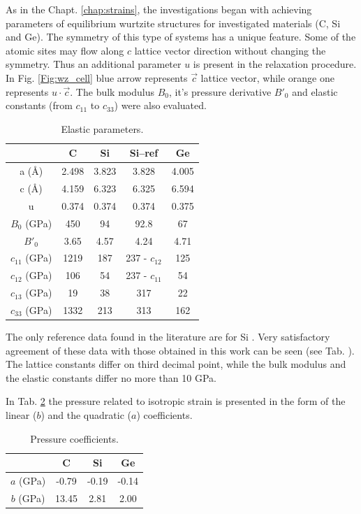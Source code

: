 As in the Chapt. \ref{chap:strains}, the investigations began with achieving parameters of equilibrium wurtzite structures for investigated materials (C, Si and Ge).
The symmetry of this type of systems has a unique feature.
Some of the atomic sites may flow along $c$ lattice vector direction without changing the symmetry.
Thus an additional parameter $u$ is present in the relaxation procedure.
In Fig. \ref{Fig:wz_cell} blue arrow represents $\Vec{c}$ lattice vector, while orange one represents $u\cdot \Vec{c}$.
The bulk modulus $B_0$, it's pressure derivative $B'_0$ and elastic constants (from $c_{11}$ to $c_{33}$) were also evaluated.
\begin{table}[!htbp]
	\centering
	\caption{Elastic parameters.}
	\label{Tab:wz_elastic}
	\begin{tabular}{|c|c|c|c|c|}
		\hline
		& C & Si & Si--ref \cite{wz_si_strain_dft} & Ge \\ \hline
		a (\AA) & 2.498 & 3.823 & 3.828 & 4.005 \\ \hline
		c (\AA) & 4.159 & 6.323 & 6.325 & 6.594 \\ \hline
		u & 0.374 & 0.374 & 0.374 & 0.375 \\ \hline
		$B_0$ (GPa) & 450 & 94 & 92.8 & 67 \\ \hline
		$B'_0$ & 3.65 & 4.57 & 4.24 & 4.71 \\ \hline
		$c_{11}$ (GPa) & 1219 & 187 & 237 - $c_{12}$ & 125 \\ \hline
		$c_{12}$ (GPa) & 106 & 54 & 237 - $c_{11}$ & 54 \\ \hline
		$c_{13}$ (GPa) & 19 & 38 & 317 & 22 \\ \hline
		$c_{33}$ (GPa) & 1332 & 213 & 313 & 162 \\ \hline
	\end{tabular}
\end{table}

The only reference data found in the literature are for Si \cite{wz_si_strain_dft}.
Very satisfactory agreement of these data with those obtained in this work can be seen (see Tab. ). The lattice constants differ on third decimal point, while the bulk modulus and the elastic constants differ no more than 10 GPa.

In Tab. \ref{Tab:wz_pressure} the pressure related to isotropic strain is presented in the form of the linear ($b$) and the quadratic ($a$) coefficients.  

\begin{table}[!htbp]
	\centering
	\caption{Pressure coefficients.}
	\label{Tab:wz_pressure}
	\begin{tabular}{|c|c|c|c|}
		\hline
		& C & Si & Ge \\ \hline
		$a$ (GPa) & -0.79 & -0.19 & -0.14 \\ \hline
		$b$ (GPa) & 13.45 & 2.81 & 2.00 \\ \hline
	\end{tabular}
\end{table}

